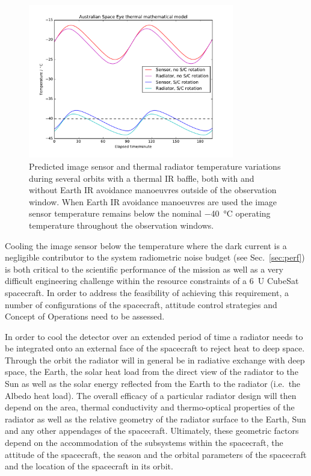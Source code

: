 \documentclass[]{iac}
\begin{document}
\begin{figure}[tbph]
  \center \includegraphics[width=0.8\textwidth]{figures/thermal.pdf}
  \caption{\label{fig:thermalplots} Predicted image sensor and thermal radiator temperature variations during several
    orbits with a thermal IR baffle, both with and without Earth IR avoidance manoeuvres outside of the observation
    window. When Earth IR avoidance manoeuvres are used the image sensor temperature remains below the nominal
    \SI{-40}{\celsius} operating temperature throughout the observation windows.}
\end{figure}

Cooling the image sensor below the temperature where the dark current is a negligible contributor to the system
radiometric noise budget (see Sec.~\ref{sec:perf}) is both critical to the scientific performance of the mission as well
as a very difficult engineering challenge within the resource constraints of a \SI{6}{U} CubeSat spacecraft. In order to
address the feasibility of achieving this requirement, a number of configurations of the spacecraft, attitude control
strategies and Concept of Operations need to be assessed.

In order to cool the detector over an extended period of time a radiator needs to be integrated onto an external face of
the spacecraft to reject heat to deep space. Through the orbit the radiator will in general be in radiative exchange
with deep space, the Earth, the solar heat load from the direct view of the radiator to the Sun as well as the solar
energy reflected from the Earth to the radiator (i.e.\ the Albedo heat load). The overall efficacy of a particular
radiator design will then depend on the area, thermal conductivity and thermo-optical properties of the radiator as well
as the relative geometry of the radiator surface to the Earth, Sun and any other appendages of the spacecraft.
Ultimately, these geometric factors depend on the accommodation of the subsystems within the spacecraft, the attitude of
the spacecraft, the season and the orbital parameters of the spacecraft and the location of the spacecraft in its orbit.
\end{document}
